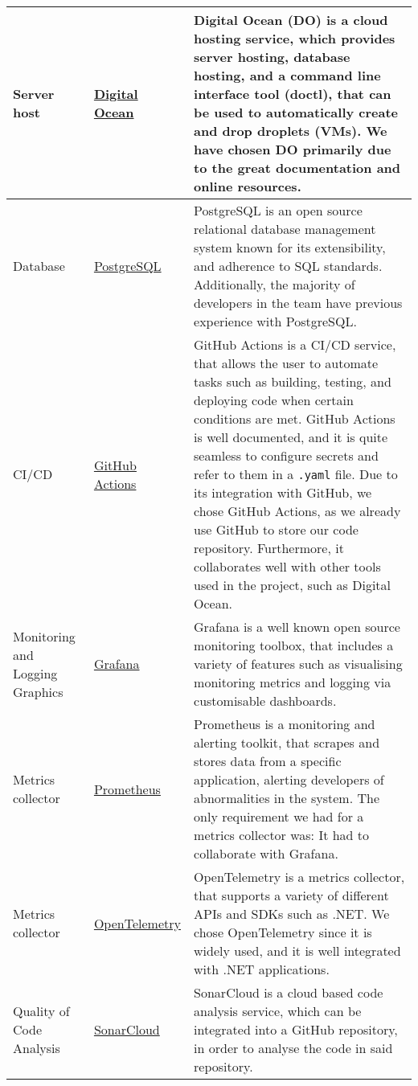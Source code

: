 \begin{longtable}{|p{}|p{} | p{}|}
    \hline
    Server host & \href{https://docs.digitalocean.com/}{Digital Ocean} & Digital Ocean (DO) is a cloud hosting service, which provides server hosting, database hosting, and a command line interface tool (doctl), that can be used to automatically create and drop droplets (VMs). We have chosen DO primarily due to the great documentation and online resources.\\
    \hline
    Database & \href{https://www.postgresql.org/docs/}{PostgreSQL} & PostgreSQL is an open source relational database management system known for its extensibility, and adherence to SQL standards. Additionally, the majority of developers in the team have previous experience with PostgreSQL.\\
    \hline
    CI/CD & \href{https://docs.github.com/en/actions}{GitHub Actions} & GitHub Actions is a CI/CD service, that allows the user to automate tasks such as building, testing, and deploying code when certain conditions are met. GitHub Actions is well documented, and it is quite seamless to configure secrets and refer to them in a \texttt{.yaml} file. Due to its integration with GitHub, we chose GitHub Actions, as we already use GitHub to store our code repository. Furthermore, it collaborates well with other tools used in the project, such as Digital Ocean.\\
    \hline
    Monitoring and Logging Graphics & \href{https://grafana.com/}{Grafana} & Grafana is a well known open source monitoring toolbox, that includes a variety of features such as visualising monitoring metrics and logging via customisable dashboards.\\
    \hline
    Metrics collector & \href{https://prometheus.io/docs/}{Prometheus} & Prometheus is a monitoring and alerting toolkit, that scrapes and stores data from a specific application, alerting developers of abnormalities in the system. The only requirement we had for a metrics collector was: It had to collaborate with Grafana.\\
    \hline
    Metrics collector & \href{https://opentelemetry.io/docs/languages/}{OpenTelemetry} & OpenTelemetry is a metrics collector, that supports a variety of different APIs and SDKs such as .NET. We chose OpenTelemetry since it is widely used, and it is well integrated with .NET applications.\\
    \hline
    Quality of Code Analysis & \href{https://www.sonarsource.com/products/sonarcloud/}{SonarCloud} & SonarCloud is a cloud based code analysis service, which can be integrated into a GitHub repository, in order to analyse the code in said repository.\\

\end{longtable}
